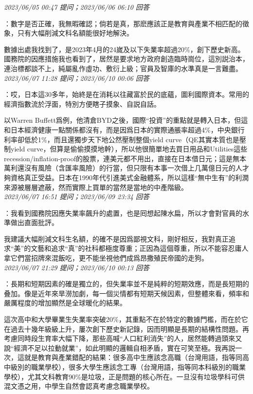 \documentclass[twocolumn]{ctexart}
\begin{document}
\textit{\hfill\noindent\small 2023/06/05 00:47 提问；2023/06/06 06:10 回答}

：數字是否正確，我無暇確認；倘若是真，那麽應該正是教育與產業不相匹配的徵象，只有大幅削減文科名額能很好地解決。


數據出處我找到了，是2023年4月的24嵗及以下失業率超過20\%，創下歷史新高。國務院的因應措施我也看到了，居然是要求地方政府創造臨時崗位，這別説治本，連治標都談不上，純屬亂作虛功、敷衍上級；官員及智庫的水準真是一言難盡。
\\

\textit{\hfill\noindent\small 2023/06/07 11:28 提问；2023/06/10 00:06 回答}

：哎，日本這30多年，始終是在消耗以往藏富於民的底蘊，圖利國際資本。常用的經濟指數流於浮面，特別方便瞎子摸象、自説自話。

以Warren Buffett爲例，他清倉BYD之後，國際“投資”的重點就是轉入日本，但這和日本經濟健康一點關係都沒有，而是因爲日本的實際通脹率超過4\%，中央銀行利率卻低於1\%，而且還獨步天下地公然壓制整個yield curve（QE其實本質也是壓制yield curve，但算是偷偷摸摸地幹），所以他很簡單地去買日用品和Utilities這些recession/inflation-proof的股票，連美元都不用出，直接在日本借日元；這是無本萬利還沒有風險（含匯率風險）的行當，但只限有本事一次借上几萬億日元的人才夠資格真正受益。日本在1990年代引進美式金融體系，所以這樣“無中生有”的利潤來源被層層遮蔽，然而實際上買單的當然是當地的中產階級。
\\

\textit{\hfill\noindent\small 2023/06/07 16:51 提问；2023/06/09 23:34 回答}

：我看到國務院因應失業率飆升的處置，也是囘想起陳水扁，所以才會對官員的水準做出直面批評。

我建議大幅削減文科生名額，的確不是因爲鄙視文科，剛好相反，我對真正追求“美”的文藝和追求“真”的社科都極度尊重；正因為這個尊重，所以不能容忍庸人拿它們當招牌來混飯吃，更不能坐視他們成爲昂撒殖民帝國的走狗。
\\

\textit{\hfill\noindent\small 2023/06/07 21:29 提问；2023/06/10 00:13 回答}

：長期和短期因素的確是獨立的，但失業率並不是純粹的短期效應，而是長短期的叠加。像是近年來旱澇加劇，每一個災情都有短期天候因素，但整體來看，頻率和嚴厲程度的增加顯然是全球暖化的結果。

這次高中和大學畢業生失業率突破20\%，其重點不在於特定的數據門檻，而在於它在過去十幾年級級上升，屢次創下歷史新記錄，因而明顯是長期的結構性問題。再考慮同時段生育率大幅下降，那些高喊“人口紅利消失”的人，居然能轉過頭來又說“經濟不足以拉動就業”，如此明顯的邏輯自相矛盾，實在可笑至極。我再説一次，這就是教育與產業錯配的結果：很多高中生應該念高職（台灣用語，指等同高中級別的職業學校），很多大學生應該念工專（台灣用語，指等同本科級別的職業學校），尤其文科教育90\%是垃圾，正是問題的核心所在。一旦沒有垃圾學科可供混文憑之用，中學生自然會認真考慮念職業學校。
\\
\end{document}
